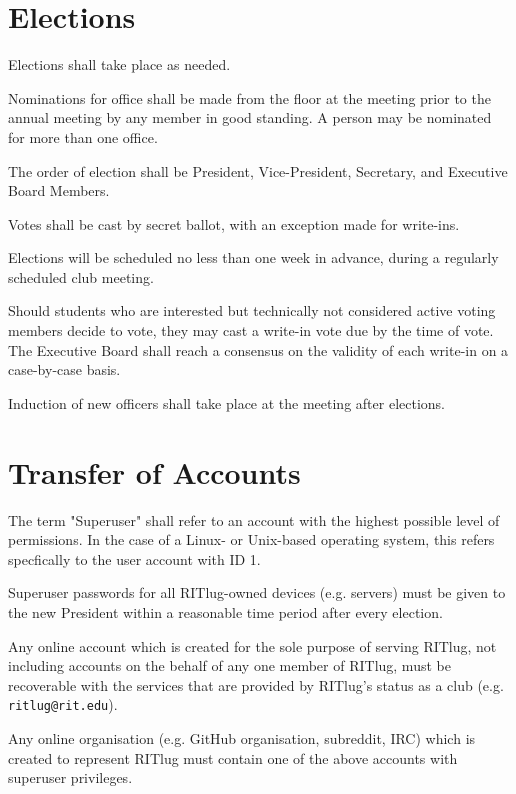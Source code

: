 \section{Elections}
\begin{subroutines}
\item Elections shall take place as needed.
\item Nominations for office shall be made from the floor at the meeting prior to the annual meeting by any member in good standing. A person may be nominated for more than one office.
\item The order of election shall be President, Vice-President, Secretary, and Executive Board Members.
\item Votes shall be cast by secret ballot, with an exception made for write-ins.
\item Elections will be scheduled no less than one week in advance, during a regularly scheduled club meeting.
\item Should students who are interested but technically not considered active voting members decide to vote, they may cast a write-in vote due by the time of vote. The Executive Board shall reach a consensus on the validity of each write-in on a case-by-case basis.
\item Induction of new officers shall take place at the meeting after elections.
\end{subroutines}

\section{Transfer of Accounts}
\begin{subroutines}
\item The term "Superuser" shall refer to an account with the highest possible level of permissions. In the case of a Linux- or Unix-based operating system, this refers specfically to the user account with ID 1.
\item Superuser passwords for all RITlug-owned devices (e.g. servers) must be given to the new President within a reasonable time period after every election.
\item Any online account which is created for the sole purpose of serving RITlug, not including accounts on the behalf of any one member of RITlug, must be recoverable with the services that are provided by RITlug's status as a club (e.g. \texttt{ritlug@rit.edu}).
\item Any online organisation (e.g. GitHub organisation, subreddit, IRC) which is created to represent RITlug must contain one of the above accounts with superuser privileges.
\end{subroutines}

